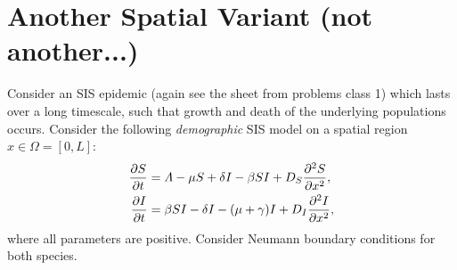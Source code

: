 \documentclass[a4paper,12pt]{article}
\begin{document}
\section{Another Spatial Variant (not another...)}
Consider an SIS epidemic (again see the sheet from problems class 1) which lasts over a long timescale, such that growth and death of the underlying populations occurs. Consider the following \emph{demographic} SIS model on a spatial region $x \in \Omega=[0,L]$:
    \begin{align*}
        \pd{S}{t} &= \Lambda - \mu S + \delta I - \beta SI + D_S\pdd{S}{x},\\
        \pd{I}{t} &= \beta SI-\delta I - (\mu+\gamma)I+D_I\pdd{I}{x},
    \end{align*}
    where all parameters are positive. Consider Neumann boundary conditions for both species.
\end{document}
